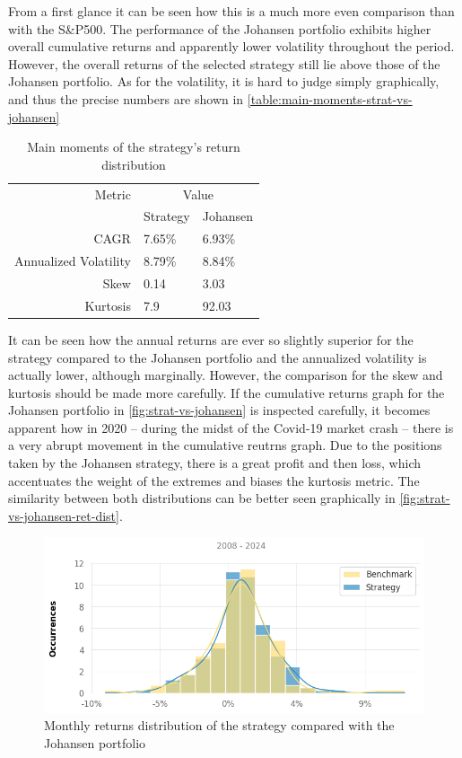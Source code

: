 From a first glance it can be seen how this is a much more even comparison than with the S\&P500. The performance of the Johansen portfolio exhibits higher overall cumulative returns and apparently lower volatility throughout the period. However, the overall returns of the selected strategy still lie above those of the Johansen portfolio. As for the volatility, it is hard to judge simply graphically, and thus the precise numbers are shown in \autoref{table:main-moments-strat-vs-johansen}

\begin{table}[ht]
    \centering
    \begin{tabular}{rll}
        \toprule
        Metric & \multicolumn{2}{c}{Value} \\ 
        \cmidrule(lr){2-3}
            & Strategy & Johansen \\
        \midrule
        CAGR & 7.65\% & 6.93\% \\
        Annualized Volatility & 8.79\% & 8.84\% \\
        Skew & 0.14 & 3.03 \\
        Kurtosis & 7.9 & 92.03 \\
        \bottomrule
    \end{tabular}
    \caption{Main moments of the strategy's return distribution}
    \label{table:main-moments-strat-vs-johansen}
\end{table}

It can be seen how the annual returns are ever so slightly superior for the strategy compared to the Johansen portfolio and the annualized volatility is actually lower, although marginally. However, the comparison for the skew and kurtosis should be made more carefully. If the cumulative returns graph for the Johansen portfolio in \autoref{fig:strat-vs-johansen} is inspected carefully, it becomes apparent how in 2020 -- during the midst of the Covid-19 market crash -- there is a very abrupt movement in the cumulative reutrns graph. Due to the positions taken by the Johansen strategy, there is a great profit and then loss, which accentuates the weight of the extremes and biases the kurtosis metric. The similarity between both distributions can be better seen graphically in \autoref{fig:strat-vs-johansen-ret-dist}.

\begin{figure}[ht]
    \captionsetup{justification=centering}
    \includegraphics[width=\linewidth]{assets/strat-vs-johansen-ret-dist.png}
    \caption{Monthly returns distribution of the strategy compared with the Johansen portfolio}
    \label{fig:strat-vs-johansen-ret-dist}
\end{figure}

